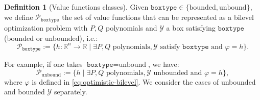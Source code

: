 \documentclass{article}
\newcommand*{\cP}{\mathcal{P}}
\newcommand*{\cY}{\mathcal{Y}}
\newcommand*{\RR}{\mathbb{R}}
\newcommand{\ff}{\varphi}
\newcommand{\formule}{\texttt{mode}}
\newcommand{\property}{\texttt{boxtype}}
\newcommand{\unbounded}{\text{unbound}}
\newcommand{\bounded}{\text{bounded}}
\newcommand{\optim}{\text{optim}}
\newcommand{\valoptim}{\varphi_o}
\newcommand{\valbilevel}{\varphi}
\theoremstyle{plain}
\theoremstyle{definition}
\newtheorem{definition}[theorem]{Definition}
\begin{document}
\begin{definition}[Value functions classes]
    \label{def:class-general-value-functions}
    Given $\property \in \{\bounded, \unbounded\}$, we define $\cP_{\property}$ the set of value functions that can be represented as a bilevel optimization problem with $P,Q$ polynomials and $\cY$ a box satisfying $\property$ (bounded or unbounded), i.e.:
    \begin{equation}
        \label{eq:nonconvex-class}
        \cP_{\property} := \{h: \RR^n \to \RR \mid \exists P, Q \text{ polynomials}, \cY \text{ satisfy $\property$ and } \valbilevel = h\}.
    \end{equation}
\end{definition}

For example, if one takes $\property = \unbounded$, we have:
\begin{equation*}
    \cP_{\unbounded} := \{h \mid \exists P, Q \text{ polynomials}, \cY \text{ unbounded and } \valbilevel = h\},
\end{equation*}
where $\valbilevel$ is defined in \eqref{eq:optimistic-bilevel}. 
We consider the cases of unbounded and bounded $\cY$ separately.
\end{document}
